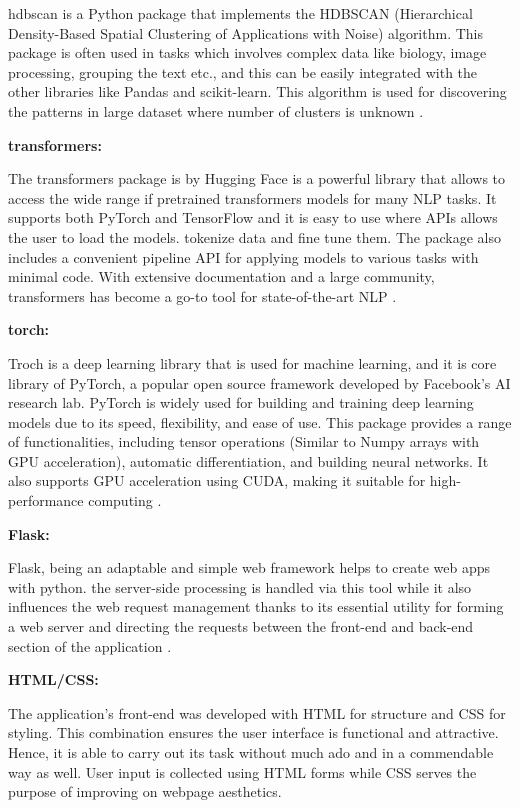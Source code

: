 hdbscan is a Python package that implements the HDBSCAN (Hierarchical Density-Based Spatial Clustering 
of Applications with Noise) algorithm. This package is often used in tasks which involves complex data
 like biology, image processing, grouping the text etc., and this can be easily integrated with the other
  libraries like Pandas and scikit-learn. This algorithm is used for discovering the patterns in large 
  dataset where number of clusters is unknown \cite{pythonlibrary}.

\noindent\textbf{transformers:}

The transformers package is by Hugging Face is a powerful library that allows to access the wide range if pretrained transformers models for many NLP tasks. It supports both PyTorch and 
TensorFlow and it is easy to use where APIs allows the user to load the models. tokenize data and fine tune them. The package also includes a convenient pipeline API for applying models 
to various tasks with minimal code. With extensive documentation and a large community, transformers has become a go-to tool for state-of-the-art NLP \cite{pythonlibrary}.

\noindent\textbf{torch:}

 Troch is a deep learning library that is used for machine learning, and it is core library of PyTorch, a popular open source framework developed by Facebook's AI research lab. PyTorch is widely used 
 for building and training deep learning models due to its speed, flexibility, and ease of use. This package provides a range of functionalities, including tensor operations (Similar to Numpy arrays with 
 GPU acceleration), automatic differentiation, and building neural networks. It also supports GPU acceleration using CUDA, making it suitable for high-performance computing \cite{pythonlibrary}.

\noindent\textbf{Flask:}

Flask, being an adaptable and simple web framework helps to create web apps with python.
the server-side processing is handled via this tool while it also influences the web request
management thanks to its essential utility for forming a web server and directing the requests
between the front-end and back-end section of the application \cite{pythonlibrary}. 
\vspace{1cm}

\noindent\textbf{HTML/CSS:}

The application's front-end was developed with HTML for structure and CSS for styling. This combination ensures the user interface is functional and attractive.
Hence, it is able to carry out its task without much ado and in a commendable way as well. User input is collected using HTML forms while CSS serves the purpose of improving on webpage aesthetics.


